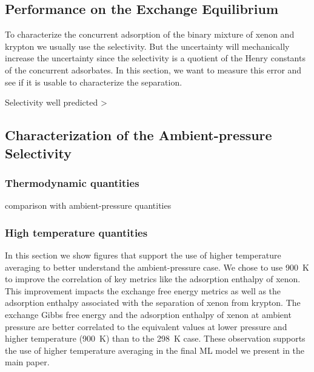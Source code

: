 \documentclass[main]{subfiles}
\begin{document}
\subsection{Performance on the Exchange Equilibrium}

To characterize the concurrent adsorption of the binary mixture of xenon and krypton we usually use the selectivity. But the uncertainty will mechanically increase the uncertainty since the selectivity is a quotient of the Henry constants of the concurrent adsorbates. In this section, we want to measure this error and see if it is usable to characterize the separation.


Selectivity well predicted > 



\subsection{Characterization of the Ambient-pressure Selectivity}

\subsubsection{Thermodynamic quantities}

comparison with ambient-pressure quantities

\subsubsection{High temperature quantities}

In this section we show figures that support the use of higher temperature averaging to better understand the ambient-pressure case. We chose to use \SI{900}{\kelvin} to improve the correlation of key metrics like the adsorption enthalpy of xenon. This improvement impacts the exchange free energy metrics as well as the adsorption enthalpy associated with the separation of xenon from krypton. The exchange Gibbs free energy and the adsorption enthalpy of xenon at ambient pressure are better correlated to the equivalent values at lower pressure and higher temperature (\SI{900}{\kelvin}) than to the \SI{298}{\kelvin} case. These observation supports the use of higher temperature averaging in the final ML model we present in the main paper.
\end{document}
